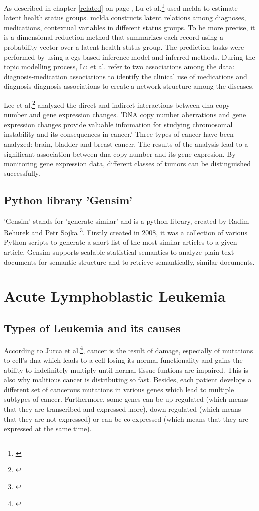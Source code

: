 As described in chapter \ref{related} on page \pageref{related}, Lu et al.\footnote{\autocite{lu_2016}} used \gls{mclda} to estimate latent health status groups. \gls{mclda} constructs latent relations among diagnoses, medications, contextual variables in different status groups. To be more precise, it is a dimensional reduction method that summarizes each record using a probability vector over a latent health status group. The prediction tasks were performed by using a \gls{cgs} based inference model and inferred methods. 
During the topic modelling process, Lu et al. refer to two associations among the data: diagnosis-medication associations to identify the clinical use of medications and diagnosis-diagnosis associations to create a network structure among the diseases.

Lee et al.\footnote{\autocite{lee}} analyzed the direct and indirect interactions between \gls{dna} copy number and gene expression changes. 'DNA copy number aberrations and gene expression changes provide valuable information for studying chromosomal instability and its consequences in cancer.' Three types of cancer have been analyzed: brain, bladder and breast cancer. The results of the analysis lead to a significant association between \gls{dna} copy number and its gene expresion. By monitoring gene expression data, different classes of tumors can be distinguished successfully.
  
\section{Python library 'Gensim'}\label{gensim}
'Gensim' stands for 'generate similar' and is a python library, created by Radim Rehurek and Petr Sojka \footnote{\autocite{gensim}}. Firstly created in  2008, it was a collection of various Python scripts to generate a short list of the most similar articles to a given article. Gensim supports scalable statistical semantics to analyze plain-text documents for semantic structure and to retrieve semantically, similar documents.            
              
\chapter{Acute Lymphoblastic Leukemia}\label{all}
\section{Types of Leukemia and its causes}\label{leukemia_types}
According to Jurca et al.\footnote{\autocite{jurca_2016}}, cancer is the result of damage, especially of mutations to cell's \gls{dna} which leads to a cell losing its normal functionality and gains the ability to indefinitely multiply until normal tissue funtions are impaired. This is also why malitious cancer is distributing so fast. Besides, each patient develops a different set of cancerous mutations in various genes which lead to multiple subtypes of cancer.
Furthermore, some genes can be up-regulated (which means that they are transcribed and expressed more), down-regulated (which means that they are not expressed) or can be co-expressed (which means that they are expressed at the same time).

